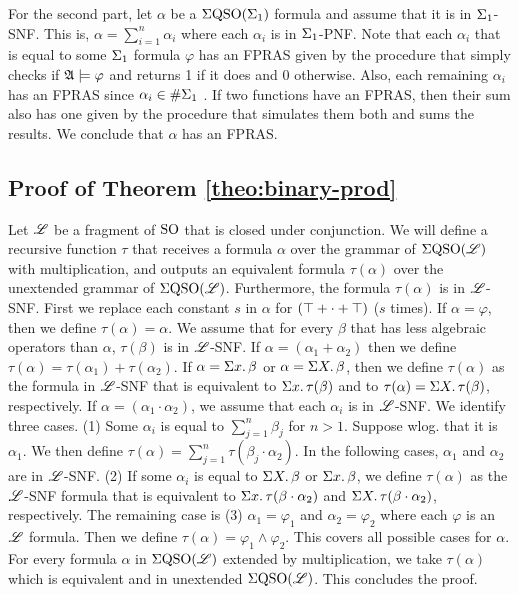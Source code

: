 \vspace{1em}
For the second part, let $\alpha$ be a $\Sigma{\rm QSO}(\Sigma_{1})$ formula and assume that it is in $\Sigma_{1}$-SNF. This is, $\alpha = \sum_{i = 1}^n\alpha_i$ where each $\alpha_i$ is in $\Sigma_{1}$-PNF. Note that each $\alpha_i$ that is equal to some $\Sigma_{1}$ formula $\varphi$ has an FPRAS given by the procedure that simply checks if $\mathfrak{A}\models\varphi$ and returns 1 if it does and 0 otherwise. Also, each remaining $\alpha_i$ has an FPRAS since $\alpha_i\in \#\Sigma_{1}$ \cite{SalujaST95}. If two functions have an FPRAS, then their sum also has one given by the procedure that simulates them both and sums the results. We conclude that $\alpha$ has an FPRAS.

\subsection*{Proof of Theorem \ref{theo:binary-prod}}

Let $\mathscr{L}$ be a fragment of ${\rm SO}$ that is closed under conjunction. We will define a recursive function $\tau$ that receives a formula $\alpha$ over the grammar of $\Sigma{\rm QSO}(\mathscr{L})$ with multiplication, and outputs an equivalent formula $\tau(\alpha)$ over the unextended grammar of $\Sigma{\rm QSO}(\mathscr{L})$. Furthermore, the formula $\tau(\alpha)$ is in $\mathscr{L}$-SNF. First we replace each constant $s$ in $\alpha$ for $(\top + \cdot + \top)$ ($s$ times). If $\alpha = \varphi$, then we define $\tau(\alpha) = \alpha$. We assume that for every $\beta$ that has less algebraic operators than $\alpha$, $\tau(\beta)$ is in $\mathscr{L}$-SNF. If $\alpha = (\alpha_1 + \alpha_2)$ then we define $\tau(\alpha) = \tau(\alpha_1) + \tau(\alpha_2)$. If $\alpha = \Sigma{x}.\,\beta$ or $\alpha = \Sigma{X}.\,\beta$, then we define $\tau(\alpha)$ as the formula in $\mathscr{L}$-SNF that is equivalent to $\Sigma{x}.\,\tau(\beta)$ and to $\tau(\alpha) = \Sigma{X}.\,\tau(\beta)$, respectively. If $\alpha = (\alpha_1 \cdot \alpha_2)$, we assume that each $\alpha_i$ is in $\mathscr{L}$-SNF. We identify three cases. (1) Some $\alpha_i$ is equal to $\sum_{j = 1}^n\beta_j$ for $n > 1$. Suppose wlog. that it is $\alpha_1$. We then define $\tau(\alpha) = \sum_{j = 1}^n\tau(\beta_j\cdot\alpha_2)$. In the following cases, $\alpha_1$ and $\alpha_2$ are in $\mathscr{L}$-SNF. (2) If some $\alpha_i$ is equal to $\Sigma{X}.\,\beta$ or $\Sigma{x}.\,\beta$, we define $\tau(\alpha)$ as the $\mathscr{L}$-SNF formula that is equivalent to $\Sigma{x}.\,\tau(\beta\cdot\alpha_2)$ and $\Sigma{X}.\,\tau(\beta\cdot\alpha_2)$, respectively. The remaining case is (3) $\alpha_1 = \varphi_1$ and $\alpha_2 = \varphi_2$ where each $\varphi$ is an $\mathscr{L}$ formula. Then we define $\tau(\alpha) = \varphi_1 \wedge \varphi_2$. This covers all possible cases for $\alpha$. For every formula $\alpha$ in $\Sigma{\rm QSO}(\mathscr{L})$ extended by multiplication, we take $\tau(\alpha)$ which is equivalent and in unextended $\Sigma{\rm QSO}(\mathscr{L})$. This concludes the proof.

